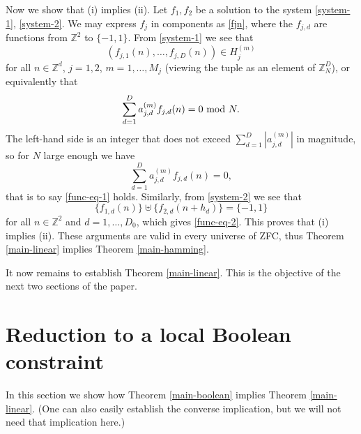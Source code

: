 \documentclass[reqno,a4paper,12pt]{amsart}
\numberwithin{equation}{section}
\numberwithin{figure}{section}
\def\Z{\mathbb{Z}}
\theoremstyle{plain}
\theoremstyle{definition}
\begin{document}
Now we show that (i) implies (ii).  Let $f_1,f_2$ be a solution to the system \eqref{system-1}, \eqref{system-2}.  We may express $f_j$ in components as
\eqref{fjn}, where the $f_{j,d}$ are functions from $\Z^2$ to $\{-1,1\}$.  From \eqref{system-1} we see that
$$ (f_{j,1}(n),\dots,f_{j,D}(n)) \in H_j^{(m)}$$
for all $n \in \Z^d$, $j=1,2$, $m=1,\dots,M_j$ (viewing the tuple as an element of $\Z_N^D$), or equivalently that
$$ \sum_{d=1}^D a_{j,d}^{(m)} f_{j,d}(n) = 0 \hbox{ mod } N.$$
The left-hand side is an integer that does not exceed $\sum_{d=1}^D |a_{j,d}^{(m)}|$ in magnitude, so for $N$ large enough we have
$$ \sum_{d=1}^D a_{j,d}^{(m)} f_{j,d}(n) = 0,$$
that is to say \eqref{func-eq-1} holds. Similarly, from \eqref{system-2} we see that
$$ \{ f_{1,d}(n)\} \uplus \{ f_{2,d}(n + h_d) \} = \{-1,1\}$$
for all $n \in \Z^2$ and $d=1,\dots,D_0$, which gives \eqref{func-eq-2}.  This proves that (i) implies (ii). These arguments are valid in every universe of ZFC, thus Theorem \ref{main-linear} implies Theorem \ref{main-hamming}.


It now remains to establish Theorem \ref{main-linear}.  This is the objective of the next two sections of the paper.

\section{Reduction to a local Boolean constraint}\label{boolean-sec}

In this section we show how Theorem \ref{main-boolean} implies Theorem \ref{main-linear}.  (One can also easily establish the converse implication, but we will not need that implication here.)
\end{document}

